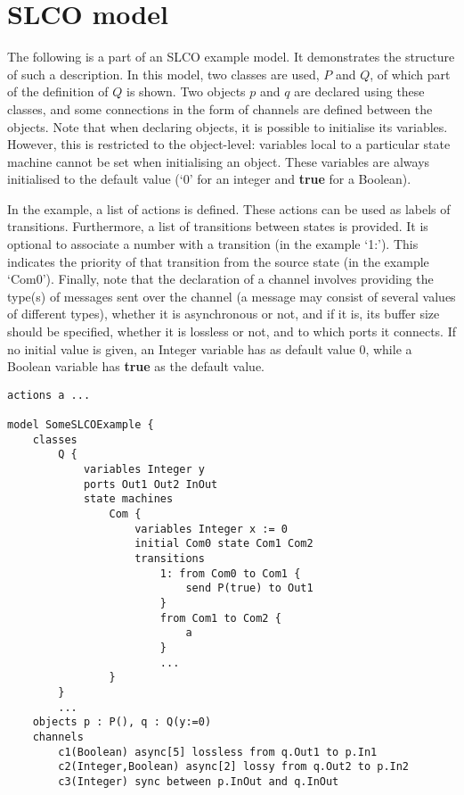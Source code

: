 \documentclass[parskip]{scrartcl}
\theoremstyle{definition}
\begin{document}
\section{SLCO model}

The following is a part of an SLCO example model. It demonstrates the structure of such a description. In this model, two classes are used, $P$ and $Q$, of which part of the definition of $Q$ is shown. Two objects $p$ and $q$ are declared using these classes, and some connections in the form of channels are defined between the objects. Note that when declaring objects, it is possible to initialise its variables. However, this is restricted to the object-level: variables local to a particular state machine cannot be set when initialising an object. These variables are always initialised to the default value (`0' for an integer and 
\textbf{true} for a Boolean).

In the example, a list of actions is defined. These actions can be used as labels of transitions. Furthermore, a list of transitions between states is provided. It is optional to associate a number with a transition (in the example `1:'). This indicates the priority of that transition from the source state (in the example `Com0'). Finally, note that the declaration of a channel involves providing the type(s) of messages sent over the channel (a message may consist of several values of different types), whether it is asynchronous or not, and if it is, its buffer size should be specified, whether it is lossless or not, and to which ports it connects. If no initial value is given, an Integer variable has as default value 0, while a Boolean variable has \textbf{true} as the default value.

\begin{verbatim}
actions a ...

model SomeSLCOExample {
    classes
        Q {
            variables Integer y
            ports Out1 Out2 InOut
            state machines
                Com {
                    variables Integer x := 0
                    initial Com0 state Com1 Com2
                    transitions
                        1: from Com0 to Com1 {
                            send P(true) to Out1
                        }
                        from Com1 to Com2 {
                            a
                        }
                        ...
                }
        }
        ...
    objects p : P(), q : Q(y:=0)
    channels
        c1(Boolean) async[5] lossless from q.Out1 to p.In1
        c2(Integer,Boolean) async[2] lossy from q.Out2 to p.In2
        c3(Integer) sync between p.InOut and q.InOut
\end{verbatim}
\end{document}
